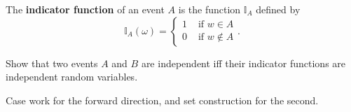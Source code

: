 \begin{definition}
	The \textbf{indicator function} of an event \( A \) is the function \( \mathbb{I}_A \) defined by \[
		\mathbb{I}_A(\omega ) = \begin{cases}
			1 &\text{ if } w \in A\\
			0 &\text{ if } w \not\in A
		\end{cases}
	.\] 
\end{definition}

\begin{eg}
	Show that two events \( A \) and \( B \) are independent iff their indicator functions are independent random variables.
\end{eg}
\begin{explanation}
	Case work for the forward direction, and set construction for the second.
\end{explanation}
